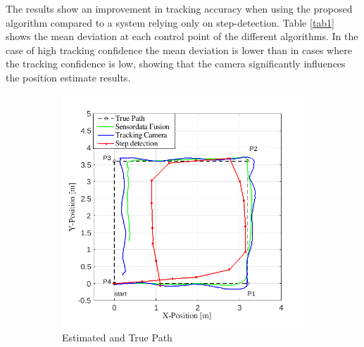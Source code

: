 \documentclass[engproc,conferenceproceedings,submit,pdftex,moreauthors]{Definitions/mdpi}
\begin{document}
The results show an improvement in tracking accuracy when using the proposed algorithm compared to a system relying only on step-detection. Table \ref{tab1} shows the mean deviation at each control point of the different algorithms. In the case of high tracking confidence the mean deviation is lower than in cases where the tracking confidence is low, showing that the camera significantly influences the position estimate results. 
\begin{figure}
	\centering
	\begin{subfigure}[b]{0.49\textwidth}
		\centering
		\hspace{-2.5cm}
		\includegraphics[width=1.11\textwidth]{Path.png}
		\caption{Estimated and True Path}
		\label{fig:path}
	\end{subfigure}
	\hfill
	\begin{subfigure}[b]{0.49\textwidth}
		\centering
		\hspace{-1cm}

\end{subfigure}
\end{figure}
\end{document}
